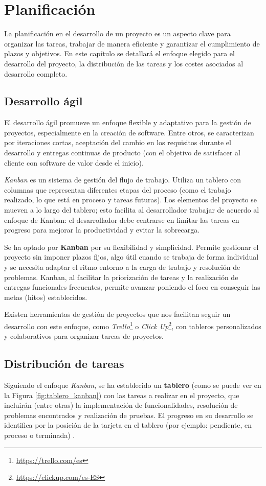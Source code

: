 \chapter{Planificación}

La planificación en el desarrollo de un proyecto es un aspecto clave para organizar las tareas, trabajar de manera eficiente y garantizar el cumplimiento de plazos y objetivos. En este capítulo se detallará el enfoque elegido para el desarrollo del proyecto, la distribución de las tareas y los costes asociados al desarrollo completo.

\section{Desarrollo ágil}
El desarrollo ágil promueve un enfoque flexible y adaptativo para la gestión de proyectos, especialmente en la creación de software. Entre otros, se caracterizan por iteraciones cortas, aceptación del cambio en los requisitos durante el desarrollo y entregas continuas de producto (con el objetivo de satisfacer al cliente con software de valor desde el inicio)\cite{agileprinciples}.

\textit{Kanban} es un sistema de gestión del flujo de trabajo. Utiliza un tablero con columnas que representan diferentes etapas del proceso (como el trabajo realizado, lo que está en proceso y tareas futuras). Los elementos del proyecto se mueven a lo largo del tablero; esto facilita al desarrollador trabajar de acuerdo al enfoque de Kanban: el desarrollador debe centrarse en limitar las tareas en progreso para mejorar la productividad y evitar la sobrecarga\cite{majkamastering}.

Se ha optado por \textbf{Kanban} por su flexibilidad y simplicidad. Permite gestionar el proyecto sin imponer plazos fijos, algo útil cuando se trabaja de forma individual y se necesita adaptar el ritmo entorno a la carga de trabajo y resolución de problemas. Kanban, al facilitar la priorización de tareas y la realización de entregas funcionales frecuentes, permite avanzar poniendo el foco en conseguir las metas (hitos) establecidos.

Existen herramientas de gestión de proyectos que nos facilitan seguir un desarrollo con este enfoque, como \textit{Trello}\footnote{\url{https://trello.com/es}} o \textit{Click Up}\footnote{\url{https://clickup.com/es-ES}}, con tableros personalizados y colaborativos para organizar tareas de proyectos.


\section{Distribución de tareas}
Siguiendo el enfoque \textit{Kanban}, se ha establecido un \textbf{tablero} (como se puede ver en la Figura \ref{fig:tablero_kanban}) con las tareas a realizar en el proyecto, que incluirán (entre otras) la implementación de funcionalidades, resolución de problemas encontrados y realización de pruebas. El progreso en su desarrollo se identifica por la posición de la tarjeta en el tablero (por ejemplo: pendiente, en proceso o terminada) .

